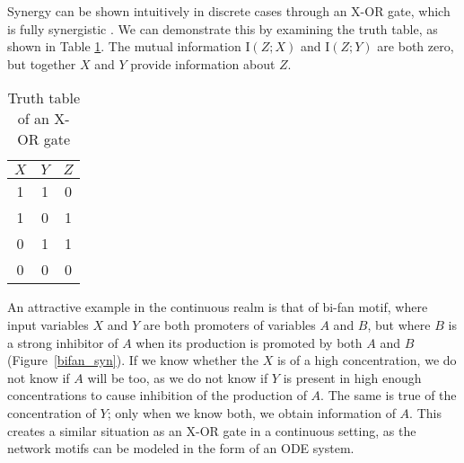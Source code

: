 \documentclass[../main.tex]{subfiles}
\begin{document}
Synergy can be shown intuitively in discrete cases through an X-OR gate, which is fully synergistic \cite{quax2017quantifying}.
We can demonstrate this by examining the truth table, as shown in Table \ref{XOR}.
The mutual information $\mathrm{I}\left( Z;X \right)$ and $\mathrm{I} \left( Z;Y \right)$ are both zero, but together $X$ and $Y$ provide information about $Z$.

\begin{table}[ht]
\begin{center}
\begin{tabular}{|c|c||c|}
\hline
$X$ & $Y$ & $Z$ \\
\hline
\hline
1 & 1 & 0 \\
1 & 0 & 1 \\
0 & 1 & 1 \\
0 & 0 & 0 \\
\hline
\end{tabular}
\end{center}
\caption{Truth table of an X-OR gate}
\label{XOR}
\end{table}

An attractive example in the continuous realm is that of bi-fan motif, where input variables $X$ and $Y$ are both promoters of variables $A$ and $B$, but where $B$ is a strong inhibitor of $A$ when its production is promoted by both $A$ and $B$ (Figure~\ref{bifan_syn}).
If we know whether the $X$ is of a high concentration, we do not know if $A$ will be too, as we do not know if $Y$ is present in high enough concentrations to cause inhibition of the production of $A$.
The same is true of the concentration of $Y$; only when we know both, we obtain information of $A$.
This creates a similar situation as an X-OR gate in a continuous setting, as the network motifs can be modeled in the form of an ODE system.
\end{document}
